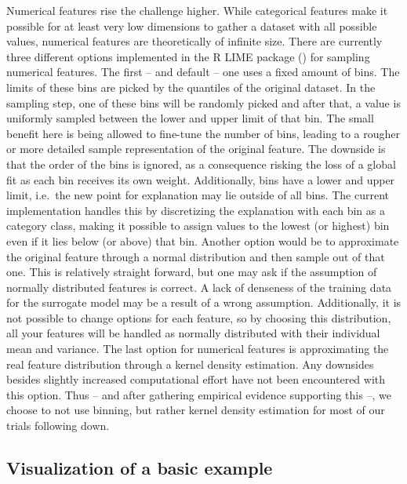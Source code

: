 \documentclass[
]{krantz}
\begin{document}
Numerical features rise the challenge higher.
While categorical features make it possible for at least very low dimensions to gather a dataset with all possible values, numerical features are theoretically of infinite size.
There are currently three different options implemented in the R LIME package (\citet{thomasp85lime}) for sampling numerical features.
The first -- and default -- one uses a fixed amount of bins.
The limits of these bins are picked by the quantiles of the original dataset.
In the sampling step, one of these bins will be randomly picked and after that, a value is uniformly sampled between the lower and upper limit of that bin.
The small benefit here is being allowed to fine-tune the number of bins, leading to a rougher or more detailed sample representation of the original feature.
The downside is that the order of the bins is ignored, as a consequence risking the loss of a global fit as each bin receives its own weight.
Additionally, bins have a lower and upper limit, i.e.~the new point for explanation may lie outside of all bins.
The current implementation handles this by discretizing the explanation with each bin as a category class, making it possible to assign values to the lowest (or highest) bin even if it lies below (or above) that bin.
Another option would be to approximate the original feature through a normal distribution and then sample out of that one.
This is relatively straight forward, but one may ask if the assumption of normally distributed features is correct.
A lack of denseness of the training data for the surrogate model may be a result of a wrong assumption.
Additionally, it is not possible to change options for each feature, so by choosing this distribution, all your features will be handled as normally distributed with their individual mean and variance.
The last option for numerical features is approximating the real feature distribution through a kernel density estimation.
Any downsides besides slightly increased computational effort have not been encountered with this option.
Thus -- and after gathering empirical evidence supporting this --, we choose to not use binning, but rather kernel density estimation for most of our trials following down.

\hypertarget{visualization-of-a-basic-example}{%
\subsection{Visualization of a basic example}\label{visualization-of-a-basic-example}}
\end{document}
